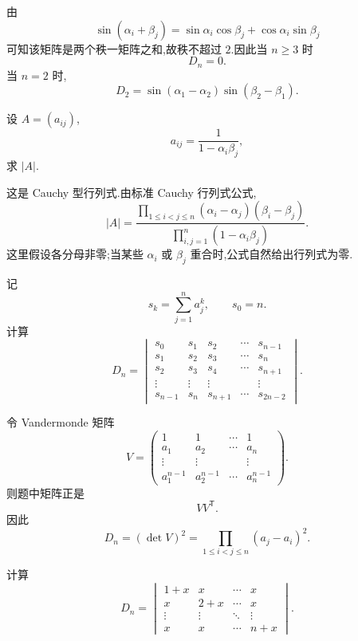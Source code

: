 \begin{solution}
由
\[
\sin(\alpha_i+\beta_j)
=
\sin\alpha_i\cos\beta_j
+
\cos\alpha_i\sin\beta_j
\]
可知该矩阵是两个秩一矩阵之和,故秩不超过 $2$.因此当 $n\geq3$ 时
\[
\boxed{D_n=0}.
\]
当 $n=2$ 时,
\[
D_2
=
\sin(\alpha_1-\alpha_2)\sin(\beta_2-\beta_1).
\]
\end{solution}


\begin{example}
设 $A=(a_{ij})$,
\[
a_{ij}=\dfrac{1}{1-\alpha_i\beta_j},
\]
求 $|A|$.
\end{example}
\exampleblank

\begin{solution}
这是 Cauchy 型行列式.由标准 Cauchy 行列式公式,
\[
\boxed{
|A|
=
\dfrac{
\displaystyle
\prod\limits_{1\leq i<j\leq n}
(\alpha_i-\alpha_j)(\beta_i-\beta_j)
}{
\displaystyle
\prod\limits_{i,j=1}^{n}(1-\alpha_i\beta_j)
}
}.
\]
这里假设各分母非零;当某些 $\alpha_i$ 或 $\beta_j$ 重合时,公式自然给出行列式为零.
\end{solution}


\begin{example}
记
\[
s_k=\sum\limits_{j=1}^{n}a_j^k,
\qquad
s_0=n.
\]
计算
\[
D_n=
\begin{vmatrix}
s_0&s_1&s_2&\cdots&s_{n-1}\\
s_1&s_2&s_3&\cdots&s_n\\
s_2&s_3&s_4&\cdots&s_{n+1}\\
\vdots&\vdots&\vdots&&\vdots\\
s_{n-1}&s_n&s_{n+1}&\cdots&s_{2n-2}
\end{vmatrix}.
\]
\end{example}
\exampleblank

\begin{solution}
令 Vandermonde 矩阵
\[
V=
\begin{pmatrix}
1&1&\cdots&1\\
a_1&a_2&\cdots&a_n\\
\vdots&\vdots&&\vdots\\
a_1^{n-1}&a_2^{n-1}&\cdots&a_n^{n-1}
\end{pmatrix}.
\]
则题中矩阵正是
\[
VV^{\mathsf T}.
\]
因此
\[
D_n
=
(\det V)^2
=
\boxed{
\prod\limits_{1\leq i<j\leq n}(a_j-a_i)^2
}.
\]
\end{solution}


\begin{example}
计算
\[
D_n=
\begin{vmatrix}
1+x&x&\cdots&x\\
x&2+x&\cdots&x\\
\vdots&\vdots&\ddots&\vdots\\
x&x&\cdots&n+x
\end{vmatrix}.
\]
\end{example}
\exampleblank

